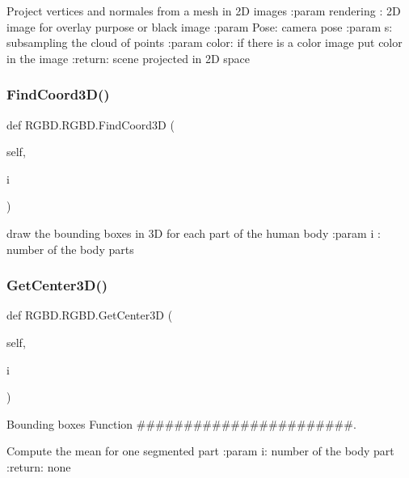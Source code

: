 \begin{DoxyVerb}Project vertices and normales from a mesh in 2D images
:param rendering : 2D image for overlay purpose or black image
:param Pose: camera pose
:param s: subsampling the cloud of points
:param color: if there is a color image put color in the image
:return: scene projected in 2D space
\end{DoxyVerb}
 \mbox{\label{class_r_g_b_d_1_1_r_g_b_d_a345e2077de5144592ad36c57885ba836}} 
\subsubsection{Find\+Coord3\+D()}
{\footnotesize\ttfamily def R\+G\+B\+D.\+R\+G\+B\+D.\+Find\+Coord3D (\begin{DoxyParamCaption}\item[{}]{self,  }\item[{}]{i }\end{DoxyParamCaption})}

\begin{DoxyVerb}draw the bounding boxes in 3D for each part of the human body
:param i : number of the body parts
\end{DoxyVerb}
 \mbox{\label{class_r_g_b_d_1_1_r_g_b_d_ac25c17b6a7e89feffc914d4b12f0b22e}} 
\subsubsection{Get\+Center3\+D()}
{\footnotesize\ttfamily def R\+G\+B\+D.\+R\+G\+B\+D.\+Get\+Center3D (\begin{DoxyParamCaption}\item[{}]{self,  }\item[{}]{i }\end{DoxyParamCaption})}



Bounding boxes Function \#\#\#\#\#\#\#\#\#\#\#\#\#\#\#\#\#\#\#\#\#\#\#. 

\begin{DoxyVerb}Compute the mean for one segmented part
:param i: number of the body part
:return: none
\end{DoxyVerb}
 \mbox{\label{class_r_g_b_d_1_1_r_g_b_d_ae3ffd53a2aef9f3d955fe40887fe88c1}} 
